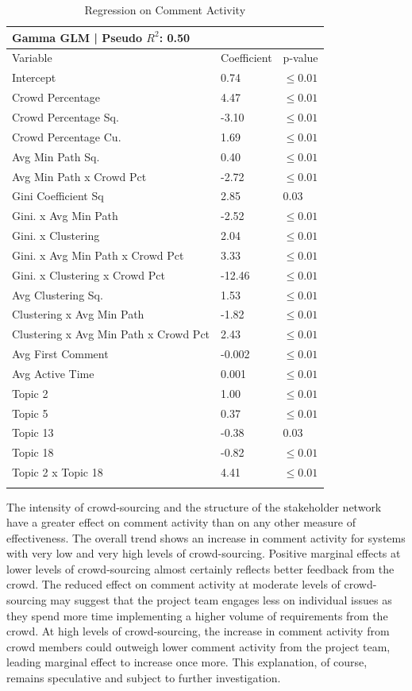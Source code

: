 \begin{table}
\caption{Regression on Comment Activity}
\label{comment_activity_regression}
\begin{tabular}{lll}
Gamma GLM | Pseudo $R^2$: 0.50 \\
\hline\noalign{\smallskip}
Variable & Coefficient & p-value  \\
\noalign{\smallskip}\hline\noalign{\smallskip}
Intercept & 0.74 & $\leq 0.01$ \\
Crowd Percentage & 4.47 & $\leq 0.01$ \\
Crowd Percentage Sq. & -3.10 & $\leq 0.01$ \\
Crowd Percentage Cu. & 1.69 & $\leq 0.01$ \\
Avg Min Path Sq. & 0.40 & $\leq 0.01$ \\
Avg Min Path x Crowd Pct & -2.72 & $\leq 0.01$ \\
Gini Coefficient Sq & 2.85 & 0.03 \\
Gini. x Avg Min Path & -2.52 & $\leq 0.01$ \\
Gini. x Clustering & 2.04 & $\leq 0.01$ \\
Gini. x Avg Min Path x Crowd Pct & 3.33 & $\leq 0.01$ \\
Gini. x Clustering x Crowd Pct & -12.46 & $\leq 0.01$ \\
Avg Clustering Sq. & 1.53 & $\leq 0.01$ \\
Clustering x Avg Min Path & -1.82 & $\leq 0.01$ \\
Clustering x Avg Min Path x Crowd Pct & 2.43 & $\leq 0.01$ \\
Avg First Comment & -0.002 & $\leq 0.01$ \\
Avg Active Time & 0.001 & $\leq 0.01$ \\
Topic 2 & 1.00 & $\leq 0.01$ \\
Topic 5 & 0.37 & $\leq 0.01$ \\
Topic 13 & -0.38 & 0.03 \\
Topic 18 & -0.82 & $\leq 0.01$ \\
Topic 2 x Topic 18 & 4.41 & $\leq 0.01$ \\
\noalign{\smallskip}\hline
\end{tabular}
\end{table}

The intensity of crowd-sourcing and the structure of the stakeholder network have a greater effect on comment activity than on any other measure of effectiveness. The overall trend shows an increase in comment activity for systems with very low and very high levels of crowd-sourcing. Positive marginal effects at lower levels of crowd-sourcing almost certainly reflects better feedback from the crowd. The reduced effect on comment activity at moderate levels of crowd-sourcing may suggest that the project team engages less on individual issues as they spend more time implementing a higher volume of requirements from the crowd. At high levels of crowd-sourcing, the increase in comment activity from crowd members could outweigh lower comment activity from the project team, leading marginal effect to increase once more. This explanation, of course, remains speculative and subject to further investigation.

